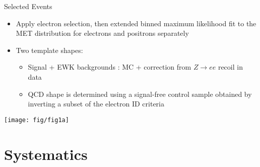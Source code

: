 \documentclass[t, 8pt]{beamer}
\begin{document}
\begin{frame}{Selected Events}
  \begin{itemize}
    \item Apply electron selection, then extended binned maximum likelihood fit to the MET distribution for electrons and positrons separately
    \item Two template shapes:
    \begin{itemize}
      \item Signal + EWK backgrounds : MC + correction from $Z \to ee$ recoil in data 
      \item QCD shape is determined using a signal-free control sample obtained by inverting a subset of the electron ID criteria
    \end{itemize}
  \end{itemize}
    \begin{center}
      \texttt{[image: fig/fig1a]}
    \end{center}
\end{frame}

\section{Systematics}

\end{document}
